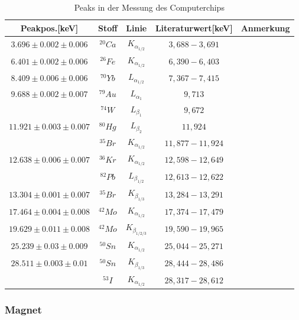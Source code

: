 \documentclass[12pt,a4paper]{article}
\begin{document}
\begin{table}[H]
\center
\begin{tabular}{|c|c|c|c|c|}
\hline 
Peakpos.[keV] & Stoff & Linie & Literaturwert[keV] & Anmerkung \\
\hline 
$3.696 \pm 0.002 \pm 0.006$& $^{20}Ca$ & $K_{\alpha_{1/2}}$ & $3,688-3,691$ & \\
\hline 
$6.401 \pm 0.002 \pm 0.006$ & $^{26}Fe$ & $K_{\alpha_{1/2}}$ & $6,390-6,403$ & \\ 
\hline 
$8.409 \pm 0.006 \pm 0.006$ & $^{70}Yb$ & $L_{\alpha_{1/2}}$ & $7,367-7,415$ & \\
\hline
$9.688 \pm 0.002 \pm 0.007$ & $^{79}Au$ & $L_{\alpha_{1}}$ & $9,713$ & \\
& $^{74}W$ & $L_{\beta_{1}}$ & $9,672$ & \\
\hline
$11.921 \pm 0.003 \pm 0.007$ & $^{80}Hg$ & $L_{\beta_{2}}$ & $11,924$ & \\
& $^{35}Br$ & $K_{\alpha_{1/2}}$ & $11,877-11,924$ & \\
\hline
$12.638 \pm 0.006 \pm 0.007$ & $^{36}Kr$ & $K_{\alpha_{1/2}}$ & $12,598-12,649$ & \\
& $^{82}Pb$ & $L_{\beta_{1/2}}$ & $12,613-12,622$ & \\
\hline
$13.304 \pm 0.001 \pm 0.007$ & $^{35}Br$ & $K_{\beta_{1/3}}$ & $13,284-13,291$ & \\
\hline
$17.464 \pm 0.004 \pm 0.008$ & $^{42}Mo$ & $K_{\alpha_{1/2}}$ & $17,374-17,479$ & \\
\hline
$19.629 \pm 0.011 \pm 0.008$ & $^{42}Mo$ & $K_{\beta_{1/2/3}}$ & $19,590-19,965$ & \\
\hline
$25.239 \pm 0.03 \pm 0.009$ & $^{50}Sn$ & $K_{\alpha_{1/2}}$ & $25,044-25,271$ & \\
\hline
$28.511 \pm 0.003 \pm 0.01$ & $^{50}Sn$ & $K_{\beta_{1/3}}$ & $28,444-28,486$ & \\
& $^{53}I$ & $K_{\alpha_{1/2}}$ & $28,317-28,612$ & \\
\hline
\end{tabular} 
\caption{Peaks in der Messung des Computerchips}
\label{prop_chip}
\end{table}

\subsubsection{Magnet}
\end{document}
